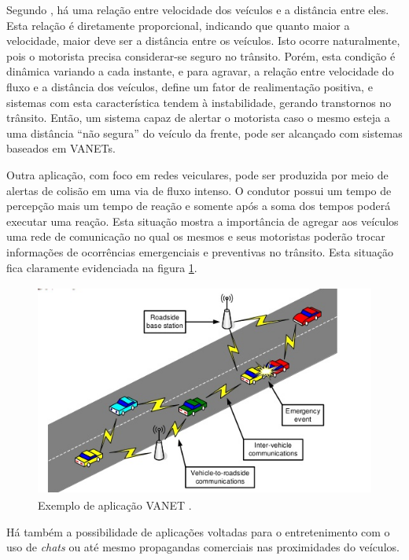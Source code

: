 \documentclass[
	12pt,				%
	oneside,			%
	a4paper,			%
	english,			%
	brazil				%
	]{abntex2ppgsi}
\begin{document}
Segundo , há uma relação entre velocidade dos veículos e a distância entre eles. Esta relação é diretamente proporcional, indicando que quanto maior a velocidade, maior deve ser a distância entre os veículos. Isto ocorre naturalmente, pois o motorista precisa considerar-se seguro no trânsito. Porém, esta condição é dinâmica variando a cada instante, e para agravar, a relação entre velocidade do fluxo e a distância dos veículos, define um fator de realimentação positiva, e sistemas com esta característica tendem à instabilidade, gerando transtornos no trânsito. Então, um sistema capaz de alertar o motorista caso o mesmo esteja a uma distância ``não segura'' do veículo da frente, pode ser alcançado com sistemas baseados em VANETs. 

Outra aplicação, com foco em redes veiculares, pode ser produzida por meio de alertas de colisão em uma via de fluxo intenso. O condutor possui um tempo de percepção mais um tempo de reação e somente após a soma dos tempos poderá executar uma reação. Esta situação mostra a importância de agregar aos veículos uma rede de comunicação no qual os mesmos e seus motoristas poderão trocar informações de ocorrências emergenciais e preventivas no trânsito. Esta situação fica claramente evidenciada na figura \ref{fig:vanetqian}. 

\begin{figure}[h!]
	\centering
	\includegraphics [width=12cm,height=7cm] {images/vanet_qian.png}
	\caption{Exemplo de aplicação VANET \cite{qian2008secure}.}
	\label{fig:vanetqian}
\end{figure}

Há também a possibilidade de aplicações voltadas para o entretenimento com o uso de \textit{chats} ou até mesmo propagandas comerciais nas proximidades do veículos.
\end{document}
